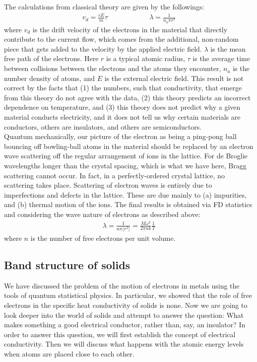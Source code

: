 \documentclass[11pt]{article}
\theoremstyle{break}
\theoremstyle{break}
\begin{document}
The calculations from classical theory are given by the followings:
\begin{align*}
v_d = \frac{eE}{m}\tau \qquad\qquad\qquad \lambda = \frac{1}{n_a \pi r^2}
\end{align*}
where $v_d$ is the drift velocity of the electrons in the material that directly contribute to the current flow, which comes from the additional, non-random piece that gets added to the velocity by the applied electric field. $\lambda$ is the mean free path of the electrons. Here $r$ is a typical atomic radius, $\tau$ is the average time between collisions between the electrons and the atoms they encounter, $n_a$ is the number density of atoms, and $E$ is the external electric field. This result is not correct by the facts that (1) the numbers, such that conductivity, that emerge from this theory do not agree with the data, (2) this theory predicts an incorrect dependence on temperature, and (3) this theory does not predict why a given material conducts electricity, and it does not  tell us why certain materials are conductors, others are insulators, and others are semiconductors.\\


Quantum mechanically, our picture of the electron as being a ping-pong ball bouncing off bowling-ball atoms in the material should be replaced by an electron wave scattering off the regular arrangement of ions in the lattice. For de Broglie wavelengths longer than the crystal spacing, which is what we have here, Bragg scattering cannot occur. In fact, in a perfectly-ordered crystal lattice, no scattering takes place. Scattering of electron waves is entirely due to imperfections and defects in the lattice. These are due mainly to (a) impurities, and (b) thermal motion of the ions. The final results is obtained via FD statistics and considering the wave nature of electrons as described above:
\begin{align*}
\lambda = \frac{1}{n\pi \langle r^2\rangle} = \frac{M\omega^2}{2\pi nk}\frac{1}{T}
\end{align*}
where $n$ is the number of free electrons per unit volume.

\subsection{Band structure of solids}
We have discussed the problem of the motion of electrons in metals using the tools of quantum statistical physics. In particular, we showed that the role of free electrons in the specific heat conductivity of solids is none. Now we are going to look deeper into the world of solids and attempt to answer the question: What makes something a good electrical conductor,  rather  than,  say,  an  insulator? In order to answer this question, we will first establish the concept of electrical conductivity. Then we will discuss what happens with the atomic energy levels when atoms are placed close to each other.\\
\end{document}
